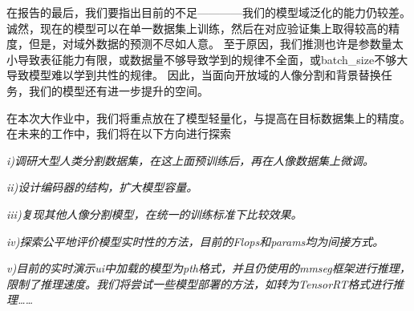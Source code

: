 \documentclass[11pt]{article}
\begin{document}
在报告的最后，我们要指出目前的不足————我们的模型域泛化的能力仍较差。诚然，现在的模型可以在单一数据集上训练，然后在对应验证集上取得较高的精度，但是，对域外数据的预测不尽如人意。
至于原因，我们推测也许是参数量太小导致表征能力有限，或数据量不够导致学到的规律不全面，或batch_size不够大导致模型难以学到共性的规律。
因此，当面向开放域的人像分割和背景替换任务，我们的模型还有进一步提升的空间。

在本次大作业中，我们将重点放在了模型轻量化，与提高在目标数据集上的精度。在未来的工作中，我们将在以下方向进行探索

\textit{i)调研大型人类分割数据集，在这上面预训练后，再在人像数据集上微调。}

\textit{ii)设计编码器的结构，扩大模型容量。}

\textit{iii)复现其他人像分割模型，在统一的训练标准下比较效果。}

\textit{iv)探索公平地评价模型实时性的方法，目前的Flops和params均为间接方式。}

\textit{v)目前的实时演示ui中加载的模型为pth格式，并且仍使用的mmseg框架进行推理，限制了推理速度。我们将尝试一些模型部署的方法，如转为TensorRT格式进行推理……}
\end{document}
